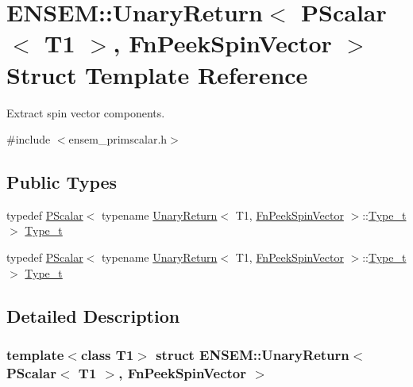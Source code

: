 \hypertarget{structENSEM_1_1UnaryReturn_3_01PScalar_3_01T1_01_4_00_01FnPeekSpinVector_01_4}{}\section{E\+N\+S\+EM\+:\+:Unary\+Return$<$ P\+Scalar$<$ T1 $>$, Fn\+Peek\+Spin\+Vector $>$ Struct Template Reference}
\label{structENSEM_1_1UnaryReturn_3_01PScalar_3_01T1_01_4_00_01FnPeekSpinVector_01_4}


Extract spin vector components.  




{\ttfamily \#include $<$ensem\+\_\+primscalar.\+h$>$}

\subsection*{Public Types}
\begin{DoxyCompactItemize}
\item 
typedef \mbox{\hyperlink{classENSEM_1_1PScalar}{P\+Scalar}}$<$ typename \mbox{\hyperlink{structENSEM_1_1UnaryReturn}{Unary\+Return}}$<$ T1, \mbox{\hyperlink{structENSEM_1_1FnPeekSpinVector}{Fn\+Peek\+Spin\+Vector}} $>$\+::\mbox{\hyperlink{structENSEM_1_1UnaryReturn_3_01PScalar_3_01T1_01_4_00_01FnPeekSpinVector_01_4_ac623af45f4638d6db8fefb084c447ef0}{Type\+\_\+t}} $>$ \mbox{\hyperlink{structENSEM_1_1UnaryReturn_3_01PScalar_3_01T1_01_4_00_01FnPeekSpinVector_01_4_ac623af45f4638d6db8fefb084c447ef0}{Type\+\_\+t}}
\item 
typedef \mbox{\hyperlink{classENSEM_1_1PScalar}{P\+Scalar}}$<$ typename \mbox{\hyperlink{structENSEM_1_1UnaryReturn}{Unary\+Return}}$<$ T1, \mbox{\hyperlink{structENSEM_1_1FnPeekSpinVector}{Fn\+Peek\+Spin\+Vector}} $>$\+::\mbox{\hyperlink{structENSEM_1_1UnaryReturn_3_01PScalar_3_01T1_01_4_00_01FnPeekSpinVector_01_4_ac623af45f4638d6db8fefb084c447ef0}{Type\+\_\+t}} $>$ \mbox{\hyperlink{structENSEM_1_1UnaryReturn_3_01PScalar_3_01T1_01_4_00_01FnPeekSpinVector_01_4_ac623af45f4638d6db8fefb084c447ef0}{Type\+\_\+t}}
\end{DoxyCompactItemize}


\subsection{Detailed Description}
\subsubsection*{template$<$class T1$>$\newline
struct E\+N\+S\+E\+M\+::\+Unary\+Return$<$ P\+Scalar$<$ T1 $>$, Fn\+Peek\+Spin\+Vector $>$}

